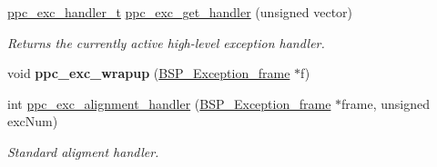 \begin{DoxyCompactItemize}
\mbox{\label{group__ppc__exc_ga89b8b9866c9c705a6bd8d043e8e47bd5}} 
\mbox{\hyperlink{group__ppc__exc_ga310d4349fafb7f5d8d5e89d6c6f39ab9}{ppc\+\_\+exc\+\_\+handler\+\_\+t}} \mbox{\hyperlink{group__ppc__exc_ga89b8b9866c9c705a6bd8d043e8e47bd5}{ppc\+\_\+exc\+\_\+get\+\_\+handler}} (unsigned vector)
\begin{DoxyCompactList}\small\item\em Returns the currently active high-\/level exception handler. \end{DoxyCompactList}\item 
\mbox{\label{group__ppc__exc_ga11ad3ddbc542902c4843f9d36252acaf}} 
void {\bfseries ppc\+\_\+exc\+\_\+wrapup} (\mbox{\hyperlink{structCPU__Exception__frame}{B\+S\+P\+\_\+\+Exception\+\_\+frame}} $\ast$f)
\item 
int \mbox{\hyperlink{group__ppc__exc_gada88a03f6f9d48393a2dae499774af9e}{ppc\+\_\+exc\+\_\+alignment\+\_\+handler}} (\mbox{\hyperlink{structCPU__Exception__frame}{B\+S\+P\+\_\+\+Exception\+\_\+frame}} $\ast$frame, unsigned exc\+Num)
\begin{DoxyCompactList}\small\item\em Standard aligment handler. \end{DoxyCompactList}\end{DoxyCompactItemize}
